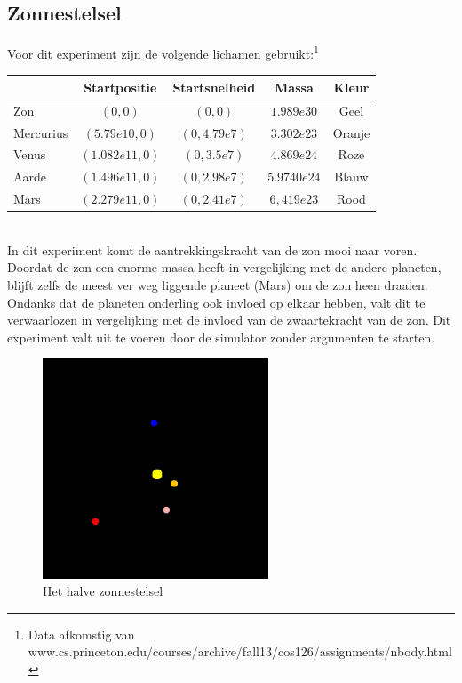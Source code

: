 \documentclass[12pt]{article}
\begin{document}
\subsection{Zonnestelsel}
Voor dit experiment zijn de volgende lichamen gebruikt:\footnote{Data afkomstig van www.cs.princeton.edu/courses/archive/fall13/cos126/assignments/nbody.html} \\[0.2cm]
\begin{tabular}{| l | c | c | c | c |}
	\hline
	& Startpositie & Startsnelheid & Massa & Kleur \\
	\hline
	Zon & $(0, 0)$ & $(0, 0)$ & $1.989e30$ & Geel \\
	\hline
	Mercurius & $(5.79e10, 0)$ & $(0, 4.79e7)$ & $3.302e23$ & Oranje \\
	\hline
	Venus & $(1.082e11, 0)$ & $(0, 3.5e7)$ & $4.869e24$ & Roze \\
	\hline
	Aarde & $(1.496e11, 0)$ & $(0, 2.98e7)$ & $5.9740e24$ & Blauw \\
	\hline
	Mars & $(2.279e11, 0)$ & $(0, 2.41e7)$ & $6,419e23$ & Rood \\
	\hline
\end{tabular} \\[0.2cm]
In dit experiment komt de aantrekkingskracht van de zon mooi naar voren. Doordat de zon een enorme massa heeft in vergelijking met de andere planeten, blijft zelfs de meest ver weg liggende planeet (Mars) om de zon heen draaien. Ondanks dat de planeten onderling ook invloed op elkaar hebben, valt dit te verwaarlozen in vergelijking met de invloed van de zwaartekracht van de zon. Dit experiment valt uit te voeren door de simulator zonder argumenten te starten.
\begin{figure}[h!]
	\centering
	\includegraphics[width=0.6\textwidth]{solar.png}
	\caption{Het halve zonnestelsel}
	\label{zonne}
\end{figure}
\end{document}
